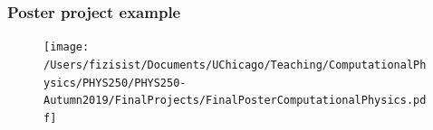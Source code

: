 \documentclass[hyperref={colorlinks=true}]{beamer}
\begin{document}

\begin{frame}%
  \frametitle{Poster project example}
  
  \begin{figure}
    \texttt{[image: /Users/fizisist/Documents/UChicago/Teaching/ComputationalPhysics/PHYS250/PHYS250-Autumn2019/FinalProjects/FinalPosterComputationalPhysics.pdf]}
  \end{figure}
  
\end{frame}
%

%
%
%  

\end{document}
